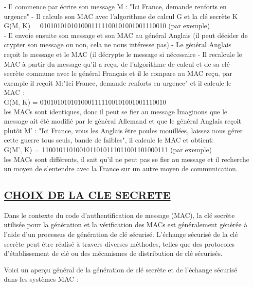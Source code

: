 -	Il commence par écrire son message M : "Ici France, demande renforts en urgence"
-	Il calcule son MAC avec l'algorithme de calcul G et la clé secrète K\\
G(M, K) = 0101010101010001111100101001001110010 (par exemple)\\
-	Il envoie ensuite son message et son MAC au général Anglais (il peut décider de crypter son message ou  non, cela ne nous intéresse pas)
-	Le général Anglais reçoit le message et le MAC (il décrypte le message si nécessaire
-	Il recalcule le MAC à partir du message qu'il a reçu, de l'algorithme de calcul et de sa clé secrète commune avec le général Français et il le compare au MAC reçu, par exemple il reçoit M:"Ici France, demande renforts en urgence" et il calcule le MAC :\\
G(M, K) = 0101010101010001111100101001001110010\\ les MACs sont identiques, donc il peut se fier au message
Imaginons que le message ait été modifié par le général Allemand et que le général Anglais reçoit plutôt M' : "Ici France, vous les Anglais être poules mouillées, laissez nous gérer cette guerre tous seuls, bande de faibles", il calcule le MAC et obtient:\\
G(M', K) = 1100101101001011010111011001101000111 (par exemple)\\ les MACs sont différents, il sait qu'il ne peut pas se fier au message et il recherche un moyen de s'entendre avec la France sur un autre moyen de communication.

\subsection{\textbf{\underline{CHOIX DE LA CLE SECRETE}}}
Dans le contexte du code d'authentification de message (MAC), la clé secrète utilisée pour la génération et la vérification des MACs est généralement générée à l'aide d'un processus de génération de clé sécurisé. L'échange sécurisé de la clé secrète peut être réalisé à travers diverses méthodes, telles que des protocoles d'établissement de clé ou des mécanismes de distribution de clé sécurisés.

Voici un aperçu général de la génération de clé secrète et de l'échange sécurisé dans les systèmes MAC :

